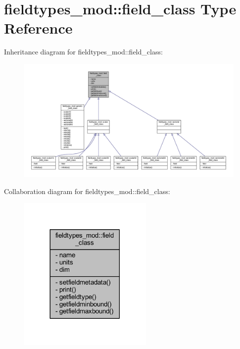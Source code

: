 \hypertarget{structfieldtypes__mod_1_1field__class}{}\section{fieldtypes\+\_\+mod\+:\+:field\+\_\+class Type Reference}
\label{structfieldtypes__mod_1_1field__class}


Inheritance diagram for fieldtypes\+\_\+mod\+:\+:field\+\_\+class\+:\nopagebreak
\begin{figure}[H]
\begin{center}
\leavevmode
\includegraphics[width=350pt]{structfieldtypes__mod_1_1field__class__inherit__graph}
\end{center}
\end{figure}


Collaboration diagram for fieldtypes\+\_\+mod\+:\+:field\+\_\+class\+:\nopagebreak
\begin{figure}[H]
\begin{center}
\leavevmode
\includegraphics[width=185pt]{structfieldtypes__mod_1_1field__class__coll__graph}
\end{center}
\end{figure}
